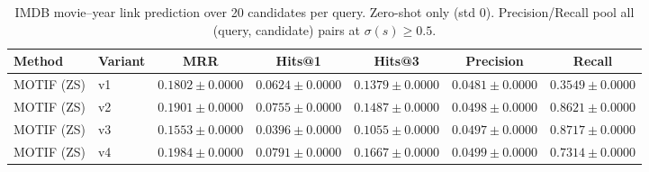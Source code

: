 \begin{table}[t]
\centering
\small
\begin{tabular}{||l||l||c|c|c||c|c||}
\hline
\textbf{Method} & \textbf{Variant} & \textbf{MRR} & \textbf{Hits@1} & \textbf{Hits@3} & \textbf{Precision} & \textbf{Recall} \\
\hline\hline
MOTIF (ZS) & v1 & $0.1802 \pm 0.0000$ & $0.0624 \pm 0.0000$ & $0.1379 \pm 0.0000$ & $0.0481 \pm 0.0000$ & $0.3549 \pm 0.0000$ \\
\hline
MOTIF (ZS) & v2 & $0.1901 \pm 0.0000$ & $0.0755 \pm 0.0000$ & $0.1487 \pm 0.0000$ & $0.0498 \pm 0.0000$ & $0.8621 \pm 0.0000$ \\
\hline
MOTIF (ZS) & v3 & $0.1553 \pm 0.0000$ & $0.0396 \pm 0.0000$ & $0.1055 \pm 0.0000$ & $0.0497 \pm 0.0000$ & $0.8717 \pm 0.0000$ \\
\hline
MOTIF (ZS) & v4 & $0.1984 \pm 0.0000$ & $0.0791 \pm 0.0000$ & $0.1667 \pm 0.0000$ & $0.0499 \pm 0.0000$ & $0.7314 \pm 0.0000$ \\
\hline
\end{tabular}
\caption{IMDB movie--year link prediction over 20 candidates per query. Zero-shot only (std 0). Precision/Recall pool all (query, candidate) pairs at $\sigma(s) \geq 0.5$.}
\label{tab:imdb_movie_year_seed_performance}
\end{table}
